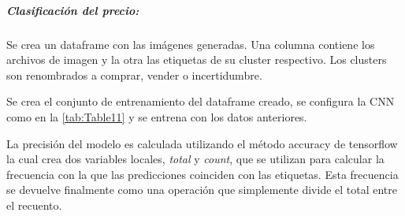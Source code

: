 \subparagraph{Clasificación del precio:}
Se crea un dataframe con las imágenes generadas. Una columna contiene los archivos de imagen y la otra las etiquetas de su cluster respectivo. Los clusters son renombrados a comprar, vender o incertidumbre.

Se crea el conjunto de entrenamiento del dataframe creado, se configura la CNN como en la \autoref{tab:Table11} y se entrena con los datos anteriores.

La precisión del modelo es calculada utilizando el método accuracy de tensorflow la cual crea dos variables locales, \emph{total} y \emph{count}, que se utilizan para calcular la frecuencia con la que las predicciones coinciden con las etiquetas. Esta frecuencia se devuelve finalmente como una operación que simplemente divide el total entre el recuento.





